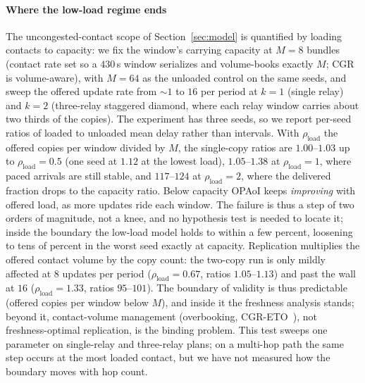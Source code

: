 \documentclass[twocolumn,3p,times,procedia]{elsarticle}
\theoremstyle{plain}
\theoremstyle{remark}
\begin{document}
\paragraph*{Where the low-load regime ends}
The uncongested-contact scope of Section~\ref{sec:model} is quantified
by loading contacts to capacity: we fix the window's carrying capacity
at $M{=}8$ bundles (contact rate set so a $430$\,s window serializes and
volume-books exactly $M$; CGR is volume-aware), with $M{=}64$ as the
unloaded control on the same seeds, and sweep the offered update rate
from ${\sim}1$ to $16$ per period at $k{=}1$ (single relay) and $k{=}2$
(three-relay staggered diamond, where each relay window carries about
two thirds of the copies). The experiment has three seeds, so we report
per-seed ratios of loaded to unloaded mean delay rather than intervals.
With $\rho_{\mathrm{load}}$ the offered copies per window divided by
$M$, the single-copy ratios are $1.00$--$1.03$ up to
$\rho_{\mathrm{load}}{=}0.5$ (one seed at $1.12$ at the lowest load),
$1.05$--$1.38$ at $\rho_{\mathrm{load}}{=}1$, where paced arrivals are
still stable, and $117$--$124$ at $\rho_{\mathrm{load}}{=}2$, where the
delivered fraction drops to the capacity ratio. Below capacity OPAoI
keeps \emph{improving} with offered load, as more updates ride each
window. The failure is thus a step of two orders of magnitude, not a
knee, and no hypothesis test is needed to locate it; inside the
boundary the low-load model holds to within a few percent, loosening to
tens of percent in the worst seed exactly at capacity. Replication
multiplies the offered contact volume by the copy count: the two-copy
run is only mildly affected at $8$ updates per period
($\rho_{\mathrm{load}}{=}0.67$, ratios $1.05$--$1.13$) and past the wall
at $16$ ($\rho_{\mathrm{load}}{=}1.33$, ratios $95$--$101$). The
boundary of validity is thus predictable (offered copies per window
below $M$), and inside it the freshness analysis stands; beyond it,
contact-volume management (overbooking,
CGR-ETO~\cite{bezirgiannidis}), not freshness-optimal replication, is
the binding problem. This test sweeps one parameter on
single-relay and three-relay plans; on a multi-hop path the same step
occurs at the most loaded contact, but we have not measured how the
boundary moves with hop count.
\end{document}
